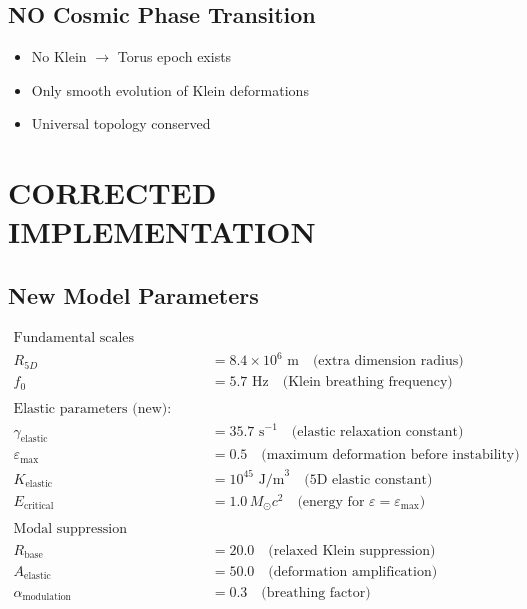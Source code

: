 \documentclass[12pt,a4paper]{article}
\begin{document}
\subsection{NO Cosmic Phase Transition}

\begin{itemize}
\item[\times] No Klein $\to$ Torus epoch exists
\item[\checkmark] Only smooth evolution of Klein deformations
\item[\checkmark] Universal topology conserved
\end{itemize}

\section{CORRECTED IMPLEMENTATION}

\subsection{New Model Parameters}

\begin{align}
\text{Fundamental scales (conserved):}\\
R_{5D} &= 8.4 \times 10^6 \text{ m} \quad \text{(extra dimension radius)}\\
f_0 &= 5.7 \text{ Hz} \quad \text{(Klein breathing frequency)}\\
\\
\text{Elastic parameters (new):}\\
\gamma_{\text{elastic}} &= 35.7 \text{ s}^{-1} \quad \text{(elastic relaxation constant)}\\
\varepsilon_{\max} &= 0.5 \quad \text{(maximum deformation before instability)}\\
K_{\text{elastic}} &= 10^{45} \text{ J/m}^3 \quad \text{(5D elastic constant)}\\
E_{\text{critical}} &= 1.0 \, M_\odot c^2 \quad \text{(energy for } \varepsilon = \varepsilon_{\max})\\
\\
\text{Modal suppression (corrected):}\\
R_{\text{base}} &= 20.0 \quad \text{(relaxed Klein suppression)}\\
A_{\text{elastic}} &= 50.0 \quad \text{(deformation amplification)}\\
\alpha_{\text{modulation}} &= 0.3 \quad \text{(breathing factor)}
\end{align}
\end{document}
